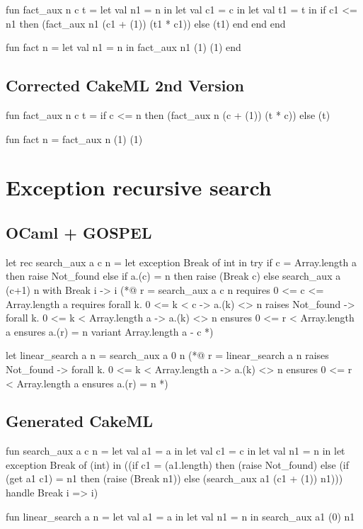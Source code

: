\begin{cakeml}
fun fact_aux n c t = let val n1 = n in
  let val c1 = c in
  let val t1 = t in
  if c1 <= n1 then (fact_aux n1 (c1 + (1)) (t1 * c1))  else (t1)
  end end end

fun fact n = let val n1 = n in fact_aux n1 (1) (1) end
\end{cakeml}

\subsection*{Corrected CakeML 2nd Version}

\begin{cakeml}
fun fact_aux n c t = 
  if c <= n then (fact_aux n (c + (1)) (t * c))  else (t)

fun fact n = fact_aux n (1) (1)
\end{cakeml}

\newpage

\section*{Exception recursive search}

\subsection*{OCaml + GOSPEL}

\begin{gospell}
let rec search_aux a c n =
  let exception Break of int in try
    if c = Array.length a then raise Not_found 
    else if a.(c) = n then raise (Break c) 
    else search_aux a (c+1) n
  with Break i -> i
(*@
  r = search_aux a c n
  requires 0 <= c <= Array.length a
  requires forall k. 0 <= k < c -> a.(k) <> n
  raises Not_found -> forall k. 0 <= k < Array.length a -> a.(k) <> n
  ensures 0 <= r < Array.length a
  ensures a.(r) = n
  variant Array.length a - c
*)

let linear_search a n = search_aux a 0 n
(*@
  r = linear_search a n
  raises Not_found -> forall k. 0 <= k < Array.length a -> a.(k) <> n
  ensures 0 <= r < Array.length a
  ensures a.(r) = n
*)
\end{gospell}

\subsection*{Generated CakeML}

\begin{cakeml}
fun search_aux a c n = let val a1 = a in
  let val c1 = c in
  let val n1 = n in
  let exception Break of (int) in
  ((if c1 = (a1.length) then (raise Not_found) 
    else (if (get a1 c1) = n1 then (raise (Break n1)) 
          else (search_aux a1 (c1 + (1)) n1)))
  handle   Break i => i)

fun linear_search a n =
  let val a1 = a in let val n1 = n in search_aux a1 (0) n1
\end{cakeml}

